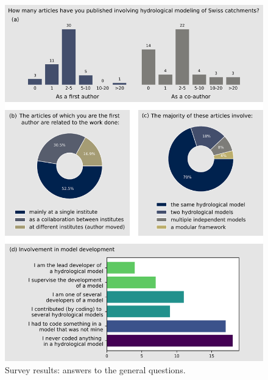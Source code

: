 \documentclass[10pt,a4paper]{article}
\begin{document}
\begin{figure}[htbp]
	\begin{center}
		\includegraphics[width=0.90\columnwidth]{figures/survey_general.pdf}
		\caption{{Survey results: answers to the general questions.
		{\label{fig:survey_general}}
		}}
	\end{center}
\end{figure}
\end{document}
